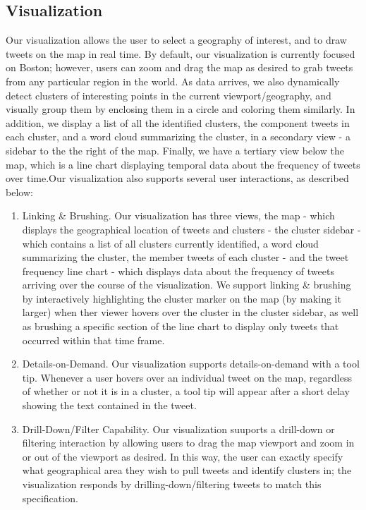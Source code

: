 \documentclass[pdftex,12pt,a4paper]{article}
\begin{document}
\subsection{Visualization}
Our visualization allows the user to select a geography of interest, and to draw tweets on the map in real time. By default, our visualization is currently focused on Boston; however, users can zoom and drag the map as desired to grab tweets from any particular region in the world. As data arrives, we also dynamically detect clusters of interesting points in the current viewport/geography, and visually group them by enclosing them in a circle and coloring them similarly. In addition, we display a list of all the identified clusters, the component tweets in each cluster, and a word cloud summarizing the cluster, in a secondary view - a sidebar to the the right of the map. Finally, we have a tertiary view below the map, which is a line chart displaying temporal data about the frequency of tweets over time.Our visualization also supports several user interactions, as described below:
\begin{enumerate}
\item Linking \& Brushing. Our visualization has three views, the map - which displays the geographical location of tweets and clusters - the cluster sidebar - which contains a list of all clusters currently identified, a word cloud summarizing the cluster, the member tweets of each cluster - and the tweet frequency line chart - which displays data about the frequency of tweets arriving over the course of the visualization. We support linking \& brushing by interactively highlighting the cluster marker on the map (by making it larger) when ther viewer hovers over the cluster in the cluster sidebar, as well as brushing a specific section of the line chart to display only tweets that occurred within that time frame.
\item Details-on-Demand. Our visualization supports details-on-demand with a tool tip. Whenever a user hovers over an individual tweet on the map, regardless of whether or not it is in a cluster, a tool tip will appear after a short delay showing the text contained in the tweet. 
\item Drill-Down/Filter Capability. Our visualization suuports a drill-down or filtering interaction by allowing users to drag the map viewport and zoom in or out of the viewport as desired. In this way, the user can exactly specify what geographical area they wish to pull tweets and identify clusters in; the visualization responds by drilling-down/filtering tweets to match this specification. 
\end{enumerate}
\end{document}
